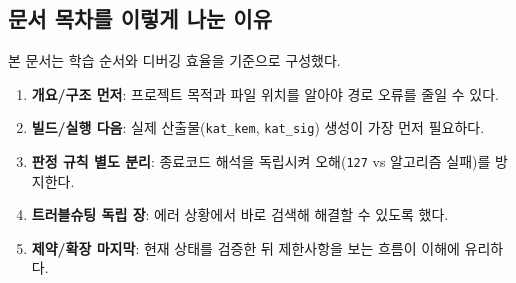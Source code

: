 \subsection{문서 목차를 이렇게 나눈 이유}
본 문서는 학습 순서와 디버깅 효율을 기준으로 구성했다.
\begin{enumerate}[leftmargin=*]
\item \textbf{개요/구조 먼저}: 프로젝트 목적과 파일 위치를 알아야 경로 오류를 줄일 수 있다.
\item \textbf{빌드/실행 다음}: 실제 산출물(\texttt{kat\_kem}, \texttt{kat\_sig}) 생성이 가장 먼저 필요하다.
\item \textbf{판정 규칙 별도 분리}: 종료코드 해석을 독립시켜 오해(\texttt{127} vs 알고리즘 실패)를 방지한다.
\item \textbf{트러블슈팅 독립 장}: 에러 상황에서 바로 검색해 해결할 수 있도록 했다.
\item \textbf{제약/확장 마지막}: 현재 상태를 검증한 뒤 제한사항을 보는 흐름이 이해에 유리하다.
\end{enumerate}
